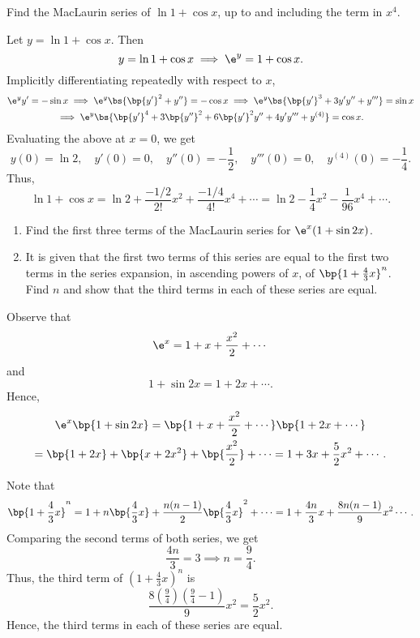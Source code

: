 \begin{problem}
    Find the MacLaurin series of $\ln{1 + \cos x}$, up to and including the term in $x^4$.
\end{problem}
\begin{solution}
    Let $y = \ln{1 + \cos x}$. Then \[y = \ln{1 + \cos x} \implies \e^y = 1 + \cos x.\] Implicitly differentiating repeatedly with respect to $x$,
    \begin{gather*}
        \e^y y' = -\sin x \implies \e^y \bs{\bp{y'}^2 + y''} = -\cos x \implies \e^y \bs{\bp{y'}^3 + 3y'y'' + y'''} = \sin x \\
        \implies \e^y \bs{\bp{y'}^4 + 3\bp{y''}^2 + 6\bp{y'}^2 y'' + 4y'y''' + y^{(4)}} = \cos x.
    \end{gather*}
    Evaluating the above at $x = 0$, we get \[y(0) = \ln 2, \quad y'(0) = 0, \quad y''(0) = -\frac12, \quad y'''(0) = 0, \quad y^{(4)}(0) = -\frac14.\] Thus, \[\ln{1 + \cos x} = \ln 2 + \frac{-1/2}{2!} x^2 + \frac{-1/4}{4!} x^4 + \cdots = \ln 2 - \frac14 x^2 - \frac1{96}x^4 + \cdots.\]
\end{solution}

\begin{problem}
    \begin{enumerate}
        \item Find the first three terms of the MacLaurin series for $\e^x (1 + \sin 2x)$.
        \item It is given that the first two terms of this series are equal to the first two terms in the series expansion, in ascending powers of $x$, of $\bp{1 + \frac43 x}^n$. Find $n$ and show that the third terms in each of these series are equal.
    \end{enumerate}
\end{problem}
\begin{solution}
    \begin{ppart}
        Observe that \[\e^x = 1 + x + \frac{x^2}{2} + \cdots\] and \[1 + \sin 2x = 1 + 2x + \cdots.\] Hence,
        \begin{gather*}
            \e^x \bp{1 + \sin 2x} = \bp{1 + x + \frac{x^2}{2} + \cdots}\bp{1 + 2x + \cdots}\\
            = \bp{1 + 2x} + \bp{x + 2x^2} + \bp{\frac{x^2}{2}} + \cdots = 1 + 3x + \frac52 x^2 + \cdots.
        \end{gather*}
    \end{ppart}
    \begin{ppart}
        Note that \[\bp{1 + \frac43 x}^n = 1 + n\bp{\frac43 x} + \frac{n(n-1)}{2} \bp{\frac43 x}^2 + \cdots = 1 + \frac{4n}3 x + \frac{8n(n-1)}{9} x^2 \cdots.\] Comparing the second terms of both series, we get \[\frac{4n}{3} = 3 \implies n = \frac94.\] Thus, the third term of $(1 + \frac43 x)^n$ is \[\frac{8(\frac94)(\frac94 - 1)}{9} x^2 = \frac52 x^2.\] Hence, the third terms in each of these series are equal.
    \end{ppart}
\end{solution}

